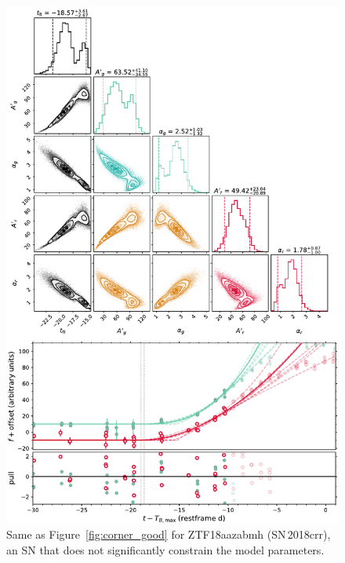 \documentclass[twocolumn]{./aastex63}
\begin{document}
\begin{figure}
    \centering
    \includegraphics[width=5.2in]{./figures/Fig3.pdf}
    \caption{Same as Figure~\ref{fig:corner_good} for ZTF18aazabmh
    (SN\,2018crr), an SN that does not significantly constrain the model
    parameters.}
    \label{fig:corner_bad}
\end{figure}
\end{document}
